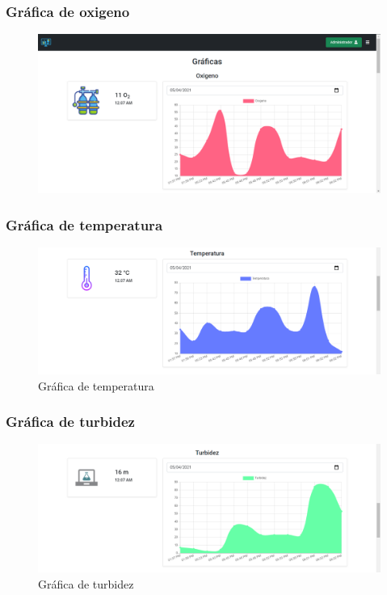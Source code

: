 \documentclass[12pt]{book}
\begin{document}
\subsubsection{Gráfica de oxigeno}

\begin{figure}[h!]
	\centering
	\includegraphics[width=0.8\linewidth]{imagenes/oxigenoGrafica}
	\caption{}
	\label{fig:oxigenografica}
\end{figure}

\subsubsection{Gráfica de temperatura}

\begin{figure}[h!]
	\centering
	\includegraphics[width=0.7\linewidth]{imagenes/temperaturaGrafica}
	\caption{Gráfica de temperatura}
	\label{fig:Gráfica de temperatura}
\end{figure}

\subsubsection{Gráfica de turbidez}

\begin{figure}[h!]
	\centering
	\includegraphics[width=0.7\linewidth]{imagenes/turbidezGrafica}
	\caption{Gráfica de turbidez}
	\label{fig:Gráfica de turbidez}
\end{figure}
\end{document}
